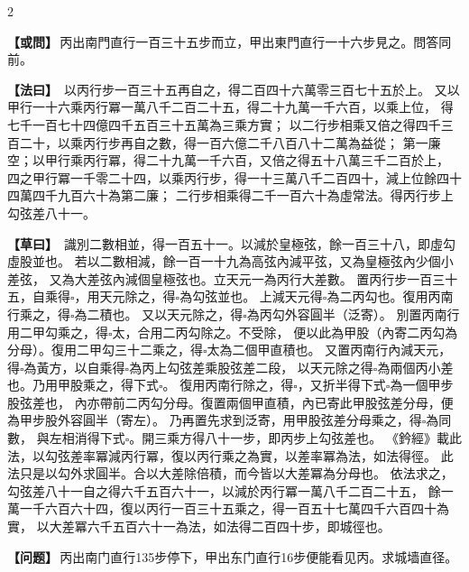 \documentclass[11pt,a4paper]{article}
\let\origsquare\square
\renewcommand{\square}{\ensuremath{\origsquare}}%
\newcommand{\clOWEN}[1]{%
  \par\vspace{0.3em}%
  \noindent\textcolor{problemcolor}{\textbf{【或問】}}\,{\tradfont #1}\par\nopagebreak%
}
\newcommand{\mdOWEN}[1]{%
  \par\vspace{0.3em}%
  \noindent\textcolor{problemcolor}{\textbf{【问题】}}\,{\modfont #1}\par\nopagebreak%
}
\newcommand{\clFAYUE}[1]{%
  \par\noindent\textcolor{methodcolor}{\textbf{【法曰】}}\,{\tradfont #1}\par\nopagebreak%
}
\newcommand{\clTSAOYUE}[1]{%
  \par\noindent\textcolor{workcolor}{\textbf{【草曰】}}\,{\tradfont #1}\par%
}
\begin{document}
\begin{paracol}{2}

\begin{leftcolumn}
\clOWEN{丙出南門直行一百三十五步而立，甲出東門直行一十六步見之。問答同前。}

\clFAYUE{%
以丙行步一百三十五再自之，得二百四十六萬零三百七十五於上。
又以甲行一十六乘丙行冪一萬八千二百二十五，得二十九萬一千六百，以乘上位，
得七千一百七十四億四千五百三十五萬為三乘方實；
以二行步相乘又倍之得四千三百二十，以乘丙行步再自之數，得一百六億二千八百八十二萬為益從；
第一廉空；以甲行乘丙行冪，得二十九萬一千六百，又倍之得五十八萬三千二百於上，
四之甲行冪一千零二十四，以乘丙行步，得一十三萬八千二百四十，減上位餘四十四萬四千九百六十為第二廉；
二行步相乘得二千一百六十為虛常法。得丙行步上勾弦差八十一。}

\clTSAOYUE{%
識別二數相並，得一百五十一。以減於皇極弦，餘一百三十八，即虛勾虛股並也。
若以二數相減，餘一百一十九為高弦內減平弦，又為皇極弦內少個小差弦，
又為大差弦內減個皇極弦也。立天元一為丙行大差數。
置丙行步一百三十五，自乘得$\square$，用天元除之，得$\square$為勾弦並也。
上減天元得$\square$為二丙勾也。復用丙南行乘之，得$\square$為二積也。
又以天元除之，得$\square$為丙勾外容圓半（泛寄）。
別置丙南行用二甲勾乘之，得$\square$太，合用二丙勾除之。不受除，
便以此為甲股（內寄二丙勾為分母）。復用二甲勾三十二乘之，得$\square$太為二個甲直積也。
又置丙南行內減天元，得$\square$為黃方，以自乘得$\square$為丙上勾弦差乘股弦差二段，
以天元除之得$\square$為兩個丙小差也。乃用甲股乘之，得下式$\square$。
復用丙南行除之，得$\square$，又折半得下式$\square$為一個甲步股弦差也，
內亦帶前二丙勾分母。復置兩個甲直積，內已寄此甲股弦差分母，便為甲步股外容圓半（寄左）。
乃再置先求到泛寄，用甲股弦差分母乘之，得$\square$為同數，
與左相消得下式$\square$。開三乘方得八十一步，即丙步上勾弦差也。
《鈐經》載此法，以勾弦差率冪減丙行冪，復以丙行乘之為實，以差率冪為法，如法得徑。
此法只是以勾外求圓半。合以大差除倍積，而今皆以大差冪為分母也。
依法求之，勾弦差八十一自之得六千五百六十一，以減於丙行冪一萬八千二百二十五，
餘一萬一千六百六十四，復以丙行一百三十五乘之，得一百五十七萬四千六百四十為實，
以大差冪六千五百六十一為法，如法得二百四十步，即城徑也。}
\end{leftcolumn}

\switchcolumn

\begin{rightcolumn}
\mdOWEN{丙出南门直行135步停下，甲出东门直行16步便能看见丙。求城墙直径。}


\end{rightcolumn}
\end{paracol}
\end{document}
